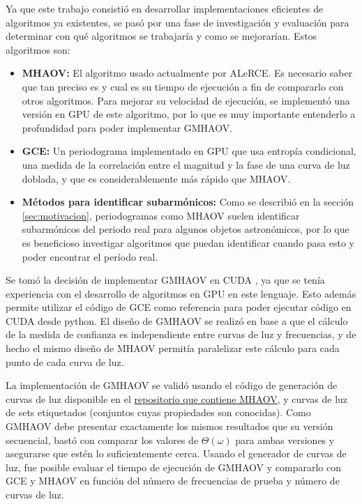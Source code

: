 Ya que este trabajo consistió en desarrollar implementaciones eficientes de algoritmos ya existentes, se pasó por una fase de investigación y evaluación para determinar con qué algoritmos se trabajaría y como se mejorarían. Estos algoritmos son:
\begin{itemize}
    \item {\bf MHAOV:} El algoritmo usado actualmente por ALeRCE. Es necesario saber que tan preciso es y cual es su tiempo de ejecución a fin de compararlo con otros algoritmos. Para mejorar su velocidad de ejecución, se implementó una versión en GPU de este algoritmo, por lo que es muy importante entenderlo a profundidad para poder implementar GMHAOV.
    \item {\bf GCE:} Un periodograma implementado en GPU que usa entropía condicional, una medida de la correlación entre el magnitud y la fase de una curva de luz doblada, y que es considerablemente más rápido que MHAOV. \cite{graham-entropy}
    \item {\bf Métodos para identificar subarmónicos:} Como se describió en la sección \ref{sec:motivacion}, periodogramas como MHAOV suelen identificar subarmónicos del periodo real para algunos objetos astronómicos, por lo que es beneficioso investigar algoritmos que puedan identificar cuando pasa esto y poder encontrar el período real.
\end{itemize}

Se tomó la decisión de implementar GMHAOV en CUDA \cite{cuda}, ya que se tenía experiencia con el desarrollo de algoritmos en GPU en este lenguaje. Esto además permite utilizar el código de GCE como referencia para poder ejecutar código en CUDA desde python. El diseño de GMHAOV se realizó en base a que el cálculo de la medida de confianza es independiente entre curvas de luz y frecuencias, y de hecho el mismo diseño de MHAOV permitía paralelizar este cálculo para cada punto de cada curva de luz.

La implementación de GMHAOV se validó usando el código de generación de curvas de luz disponible en el 
\href{https://github.com/alercebroker/P4J}{repositorio que contiene MHAOV}, y curvas de luz de sets etiquetados (conjuntos cuyas propiedades son conocidas). Como GMHAOV debe presentar exactamente los mismos resultados que su versión secuencial, bastó con comparar los valores de $\Theta(\omega)$ para ambas versiones y asegurarse que estén lo suficientemente cerca. Usando el generador de curvas de luz, fue posible evaluar el tiempo de ejecución de GMHAOV y compararlo con GCE y MHAOV en función del número de frecuencias de prueba y número de curvas de luz.

